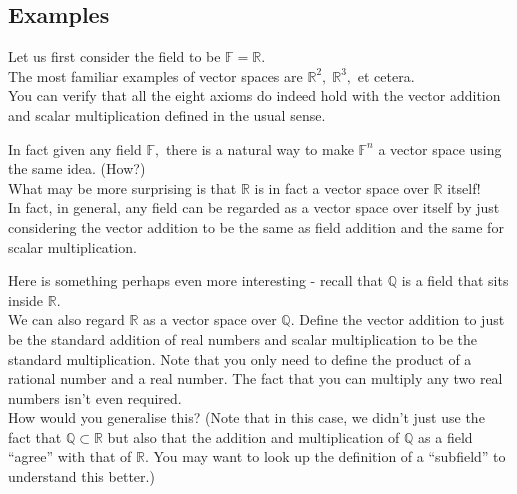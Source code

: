 \documentclass[12pt]{article}
\begin{document}
\subsection{Examples}
Let us first consider the field to be $\mathbb{F} = \mathbb{R}.$\\
The most familiar examples of vector spaces are $\mathbb{R}^2,\;\mathbb{R}^3,$ et cetera.\\
You can verify that all the eight axioms do indeed hold with the vector addition and scalar multiplication defined in the usual sense.

%
In fact given any field $\mathbb{F},$ there is a natural way to make $\mathbb{F}^n$ a vector space using the same idea. (How?)\\
What may be more surprising is that $\mathbb{R}$ is in fact a vector space over $\mathbb{R}$ itself!\\
In fact, in general, any field can be regarded as a vector space over itself by just considering the vector addition to be the same as field addition and the same for scalar multiplication.

%
Here is something perhaps even more interesting - recall that $\mathbb{Q}$ is a field that sits inside $\mathbb{R}.$\\
We can also regard $\mathbb{R}$ as a vector space over $\mathbb{Q}.$ Define the vector addition to just be the standard addition of real numbers and scalar multiplication to be the standard multiplication. Note that you only need to define the product of a rational number and a real number. The fact that you can multiply any two real numbers isn't even required.\\
How would you generalise this? (Note that in this case, we didn't just use the fact that $\mathbb{Q} \subset \mathbb{R}$ but also that the addition and multiplication of $\mathbb{Q}$ as a field ``agree'' with that of $\mathbb{R}$. You may want to look up the definition of a ``subfield'' to understand this better.) 
\end{document}
